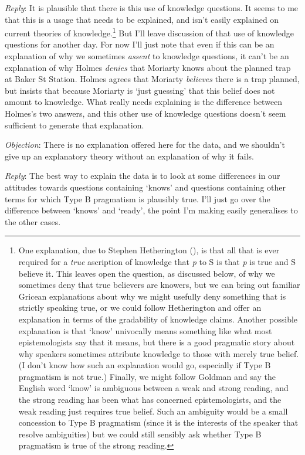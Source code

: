 \documentclass[
  11pt,
  letterpaper,
  DIV=11,
  numbers=noendperiod,
  twoside]{scrartcl}
\begin{document}
\emph{Reply}: It is plausible that there is this use of knowledge
questions. It seems to me that this is a usage that needs to be
explained, and isn't easily explained on current theories of
knowledge.\footnote{One explanation, due to Stephen Hetherington
  (), is that all that is ever
  required for a \emph{true} ascription of knowledge that \emph{p} to S
  is that \emph{p} is true and S believe it. This leaves open the
  question, as discussed below, of why we sometimes deny that true
  believers are knowers, but we can bring out familiar Gricean
  explanations about why we might usefully deny something that is
  strictly speaking true, or we could follow Hetherington and offer an
  explanation in terms of the gradability of knowledge claims. Another
  possible explanation is that `know' univocally means something like
  what most epistemologists say that it means, but there is a good
  pragmatic story about why speakers sometimes attribute knowledge to
  those with merely true belief. (I don't know how such an explanation
  would go, especially if Type B pragmatism is not true.) Finally, we
  might follow Goldman and say the English word `know' is ambiguous
  between a weak and strong reading, and the strong reading has been
  what has concerned epistemologists, and the weak reading just requires
  true belief. Such an ambiguity would be a small concession to Type B
  pragmatism (since it is the interests of the speaker that resolve
  ambiguities) but we could still sensibly ask whether Type B pragmatism
  is true of the strong reading.} But I'll leave discussion of that use
of knowledge questions for another day. For now I'll just note that even
if this can be an explanation of why we sometimes \emph{assent} to
knowledge questions, it can't be an explanation of why Holmes
\emph{denies} that Moriarty knows about the planned trap at Baker St
Station. Holmes agrees that Moriarty \emph{believes} there is a trap
planned, but insists that because Moriarty is `just guessing' that this
belief does not amount to knowledge. What really needs explaining is the
difference between Holmes's two answers, and this other use of knowledge
questions doesn't seem sufficient to generate that explanation.

\emph{Objection}: There is no explanation offered here for the data, and
we shouldn't give up an explanatory theory without an explanation of why
it fails.

\emph{Reply}: The best way to explain the data is to look at some
differences in our attitudes towards questions containing `knows' and
questions containing other terms for which Type B pragmatism is
plausibly true. I'll just go over the difference between `knows' and
`ready', the point I'm making easily generalises to the other cases.
\end{document}

